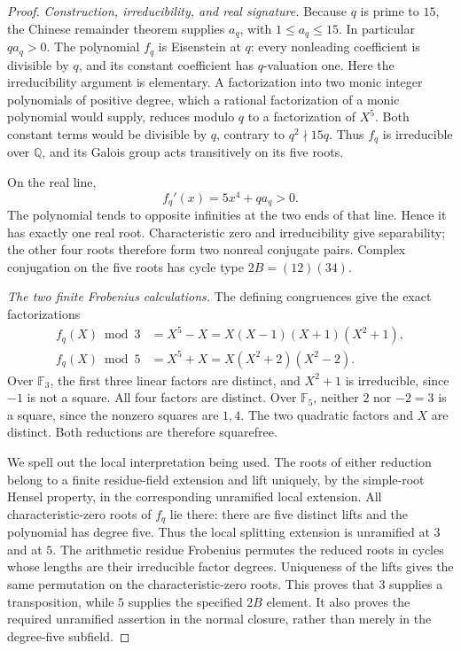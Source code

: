 \begin{proof}
\emph{Construction, irreducibility, and real signature.}
Because \(q\) is prime to \(15\), the Chinese remainder
theorem supplies \(a_q\), with \(1\le a_q\le15\).
In particular \(qa_q>0\).
The polynomial \(f_q\) is Eisenstein at \(q\):
every nonleading coefficient is divisible by \(q\),
and its constant coefficient has \(q\)-valuation one.
Here the irreducibility argument is elementary.
A factorization into two monic integer polynomials
of positive degree, which a rational factorization of
a monic polynomial would supply, reduces modulo \(q\)
to a factorization of \(X^5\). Both constant terms
would be divisible by \(q\), contrary to
\(q^2\nmid15q\).
Thus \(f_q\) is irreducible over \(\mathbb Q\), and
its Galois group acts transitively on its five roots.

On the real line,
\[
                         f_q'(x)=5x^4+qa_q>0.
\]
The polynomial tends to opposite infinities at the
two ends of that line. Hence it has exactly one
real root. Characteristic zero and irreducibility
give separability; the other four roots therefore
form two nonreal conjugate pairs. Complex conjugation
on the five roots has cycle type \(2B=(12)(34)\).

\emph{The two finite Frobenius calculations.}
The defining congruences give the exact factorizations
\[
 \begin{aligned}
 f_q(X)\bmod3
   &=X^5-X=X(X-1)(X+1)(X^2+1),\\
 f_q(X)\bmod5
   &=X^5+X=X(X^2+2)(X^2-2).
 \end{aligned}
 \tag{MA-RB.102}
\]
Over \(\mathbb F_3\), the first three linear factors
are distinct, and \(X^2+1\) is irreducible, since
\(-1\) is not a square. All four factors are distinct.
Over \(\mathbb F_5\), neither \(2\) nor \(-2=3\)
is a square, since the nonzero squares are \(1,4\).
The two quadratic factors and \(X\) are distinct.
Both reductions are therefore squarefree.

We spell out the local interpretation being used.
The roots of either reduction belong to a finite
residue-field extension and lift uniquely, by the
simple-root Hensel property, in the corresponding
unramified local extension. All characteristic-zero
roots of \(f_q\) lie there: there are five distinct
lifts and the polynomial has degree five.
Thus the local splitting extension is unramified
at \(3\) and at \(5\). The arithmetic residue
Frobenius permutes the reduced roots in cycles whose
lengths are their irreducible factor degrees.
Uniqueness of the lifts gives the same permutation
on the characteristic-zero roots.
This proves that \(3\) supplies a transposition,
while \(5\) supplies the specified \(2B\) element.
It also proves the required unramified assertion
in the normal closure, rather than merely in
the degree-five subfield.


\end{proof}
